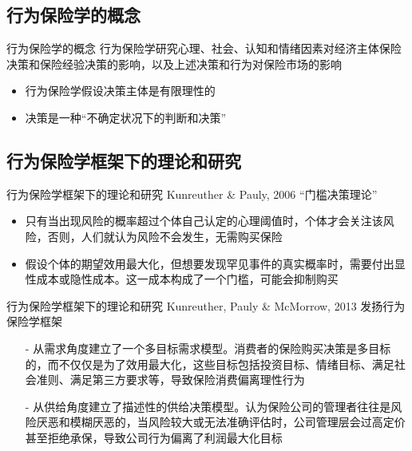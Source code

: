\documentclass[presentation]{beamer}
\begin{document}
\subsection{行为保险学的概念}
\begin{frame}{行为保险学的概念}
	行为保险学研究心理、社会、认知和情绪因素对经济主体保险决策和保险经验决策的影响，以及上述决策和行为对保险市场的影响
	\begin{itemize}
		\item  行为保险学假设决策主体是有限理性的
		\item 决策是一种“不确定状况下的判断和决策”
	\end{itemize}
\end{frame}
\subsection{行为保险学框架下的理论和研究}
\begin{frame}{行为保险学框架下的理论和研究}
	Kunreuther \& Pauly, 2006 “门槛决策理论”
	\begin{itemize}
		\item 只有当出现风险的概率超过个体自己认定的心理阈值时，个体才会关注该风险，否则，人们就认为风险不会发生，无需购买保险
		\item 假设个体的期望效用最大化，但想要发现罕见事件的真实概率时，需要付出显性成本或隐性成本。这一成本构成了一个门槛，可能会抑制购买
	\end{itemize}
\end{frame}
\begin{frame}{行为保险学框架下的理论和研究}
	Kunreuther, Pauly \& McMorrow, 2013 发扬行为保险学框架

	\begin{itemize}
		\item[-] 从需求角度建立了一个多目标需求模型。消费者的保险购买决策是多目标的，而不仅仅是为了效用最大化，这些目标包括投资目标、情绪目标、满足社会准则、满足第三方要求等，导致保险消费偏离理性行为
		\item[-] 从供给角度建立了描述性的供给决策模型。认为保险公司的管理者往往是风险厌恶和模糊厌恶的，当风险较大或无法准确评估时，公司管理层会过高定价甚至拒绝承保，导致公司行为偏离了利润最大化目标
	\end{itemize}
\end{frame}
\end{document}
